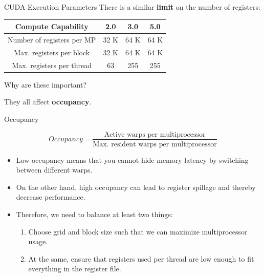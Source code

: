 \documentclass[9pt]{beamer}
\begin{document}
\begin{frame}[t]{CUDA Execution Parameters}
There is a similar \textbf{limit} on the number of registers: 

\bigskip

\begin{center}

\begin{tabular}{|c|c|c|c|}
\hline
Compute Capability & 2.0 & 3.0 & 5.0 \\
\hline
Number of registers per MP & 32 K & 64 K & 64 K \\
\hline
Max. registers per block & 32 K & 64 K & 64 K  \\
\hline
Max. registers per thread & 63 & 255 & 255 \\ 
\hline

\end{tabular}
\end{center}

\bigskip

Why are these important? 

\pause 

\bigskip

They all affect \textbf{occupancy}. 

\end{frame}


\begin{frame}[t]{Occupancy}

\[ Occupancy = \frac{\text{Active warps per multiprocessor} } {\text {Max. resident warps per multiprocessor} } \]

\pause 

\begin{itemize}
	\medskip
	\item Low occupancy means that you cannot hide memory latency by switching between different warps. 
    
    \pause
    \medskip
    \item On the other hand, high occupancy can lead to register spillage and thereby decrease performance. 
    
    \pause
    \medskip
    \item Therefore, we need to balance at least two things: 
    \medskip
    \begin{enumerate}
    	\item Choose grid and block size such that we can maximize multiprocessor usage. 
        \pause 
        \smallskip
        \item At the same, ensure that registers used per thread are low enough to fit everything in the register file.  
    \end{enumerate}
\end{itemize}

\end{frame}
\end{document}
